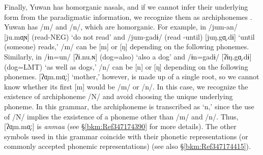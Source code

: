 Finally, Yuwan has homorganic nasals, and if we cannot infer their underlying form from the paradigmatic information, we recognize them as archiphonemes \citep[46--49]{Lass1984}. Yuwan has /m/ and /n/, which are homorganic. For example, in /jum-an/ [ju.mɑ̟ɴ] (read-NEG) ‘do not read’ and /jum-gadɨ/ (read -until) [juŋ.gɑ̟.dɨ] ‘until (someone) reads,’ /m/ can be [m] or [ŋ] depending on the following phonemes. Similarly, in /ɨn=un/ [ʔɨ.nu.ɴ] (dog=also) ‘also a dog’ and /ɨn=gadɨ/ [ʔɨŋ.gɑ̟.dɨ] (dog=LMT) ‘as well as dogs,’ /n/ can be [n] or [ŋ] depending on the following phonemes. [ʔɑ̟m.mɑ̟ː] ‘mother,’ however, is made up of a single root, so we cannot know whether its first [m] would be /m/ or /n/. In this case, we recognize the existence of archiphoneme /N/ and avoid choosing the unique underlying phoneme. In this grammar, the archiphoneme is transcribed as ‘n,’ since the use of /N/ implies the exsistence of a phoneme other than /m/ and /n/. Thus, [ʔɑ̟m.mɑ̟ː] is \textit{anmaa} (see §\ref{bkm:Ref347174390} for more details). The other symbols used in this grammar coincide with their phonetic representations (or commonly accepted phonemic representations) (see also §\ref{bkm:Ref347174415}).
